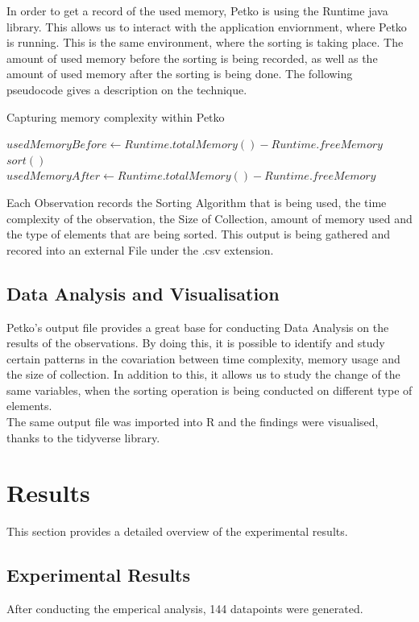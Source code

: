 \documentclass[]{report}
\begin{document}
In order to get a record of the used memory, Petko is using the Runtime java library. This allows us to interact with the application enviornment, where Petko is running. This is the same environment, where the sorting is taking place. The amount of used memory before the sorting is being recorded, as well as the amount of used memory after the sorting is being done. The following pseudocode gives a description on the technique. \\


\begin{algorithm}
	\caption{Capturing memory complexity within Petko}\label{alg:cap}
	\begin{algorithmic}
		\State $usedMemoryBefore \gets Runtime.totalMemory() - Runtime.freeMemory$ 
		\State $sort()$ 
		\State $usedMemoryAfter \gets Runtime.totalMemory() - Runtime.freeMemory$ 
	\end{algorithmic}
\end{algorithm}

		 Each Observation records the Sorting Algorithm that is being used, the time complexity of the observation, the Size of Collection, amount of memory used and the type of elements that are being sorted. This output is being gathered and recored into an external File under the .csv extension. 
		\subsection{Data Analysis and Visualisation}
		Petko's output file provides a great base for conducting Data Analysis on the results of the observations. By doing this, it is possible to identify and study certain patterns in the covariation between time complexity, memory usage and the size of collection. In addition to this, it allows us to study the change of the same variables, when the sorting operation is being conducted on different type of elements. \\ The same output file was imported into R and the findings were visualised, thanks to the tidyverse library.
		\clearpage
		\section{Results}
		This section provides a detailed overview of the experimental results.
		\subsection{Experimental Results}
		After conducting the emperical analysis, 144 datapoints were generated. 
		
\end{document}
